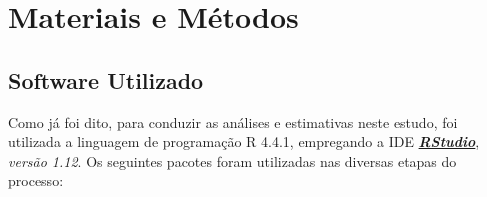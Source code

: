 \documentclass[a4paper,11pt]{article} %
\begin{document}
\section{Materiais e Métodos} %
\subsection{Software Utilizado} %

Como já foi dito, para conduzir as análises e estimativas neste estudo, foi utilizada a linguagem de programação R 4.4.1, empregando a IDE \href{https://posit.co/download/rstudio-desktop/}{\textit{\textbf{RStudio}}}, \textit{versão 1.12}. Os seguintes pacotes foram utilizadas nas diversas etapas do processo:
\end{document}

